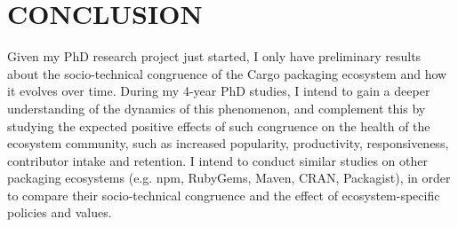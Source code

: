 \section{CONCLUSION}

Given my PhD research project just started, I only have preliminary results about the socio-technical congruence of the Cargo packaging ecosystem and how it evolves over time.
During my 4-year PhD studies, I intend to gain a deeper understanding of the dynamics of this phenomenon, and complement this by studying the expected positive effects of such congruence on the health of the ecosystem community, such as increased popularity, productivity, responsiveness, contributor intake and retention.
I intend to conduct similar studies on other packaging ecosystems  (e.g. npm, RubyGems, Maven, CRAN, Packagist), in order to compare their socio-technical congruence and the effect of ecosystem-specific policies and values.
